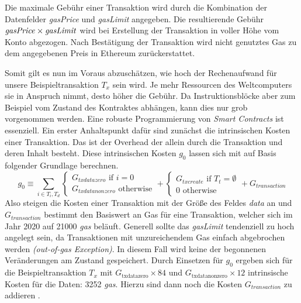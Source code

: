 \documentclass[runningheads]{llncs}
\begin{document}
Die maximale Gebühr einer Transaktion wird durch die Kombination der Datenfelder \textit{gasPrice} und \textit{gasLimit} angegeben. Die resultierende Gebühr $ \text{\textit{gasPrice}} \times \text{\textit{gasLimit}} $ wird bei Erstellung der Transaktion in voller Höhe vom Konto abgezogen. Nach Bestätigung der Transaktion wird nicht genutztes Gas zu dem angegebenen Preis in Ethereum zurückerstattet.

Somit gilt es nun im Voraus abzuschätzen, wie hoch der Rechenaufwand für unsere Beispieltransaktion $ T_x $ sein wird. Je mehr Ressourcen des Weltcomputers sie in Anspruch nimmt, desto höher die Gebühr. Da Instruktionsblöcke aber zum Beispiel vom Zustand des Kontraktes abhängen, kann dies nur grob vorgenommen werden. Eine robuste Programmierung von \textit{Smart Contracts} ist essenziell. Ein erster Anhaltspunkt dafür sind zunächst die intrinsischen Kosten einer Transaktion. Das ist der Overhead der allein durch die Transaktion und deren Inhalt besteht. Diese intrinsischen Kosten $ g_0 $ lassen sich mit auf Basis folgender Grundlage berechnen.
$$ g_0 \equiv \sum_{i \in T_i, T_d}
  \begin{cases}
    G_{txdatazero} \text{ if } i=0 \\
    G_{txdatanonzero} \text{ otherwise}
  \end{cases}
  +
  \begin{cases}
    G_{txcreate} \text{ if } T_t = \emptyset \\
    0 \text{ otherwise}
  \end{cases}
  +
  G_{transaction}
$$
Also steigen die Kosten einer Transaktion mit der Größe des Feldes \textit{data} an und $ G_{transaction} $ bestimmt den Basiswert an Gas für eine Transaktion, welcher sich im Jahr 2020 auf 21000 \textit{gas} beläuft. Generell sollte das \textit{gasLimit} tendenziell zu hoch angelegt sein, da Transaktionen mit unzureichendem Gas einfach abgebrochen werden \textit{(out-of-gas Exception)}. In diesem Fall wird keine der begonnenen Veränderungen am Zustand gespeichert. Durch Einsetzen für $ g_0 $ ergeben sich für die Beispieltransaktion $ T_x $ mit $ G_{\text{txdatazero}} \times 84 $ und $ G_{\text{txdatanonzero}} \times 12 $ intrinsische Kosten für die Daten: 3252 \textit{gas}. Hierzu sind dann noch die Kosten $ G_{transaction} $ zu addieren \cite{neemann_appendix_nodate}.
\end{document}
